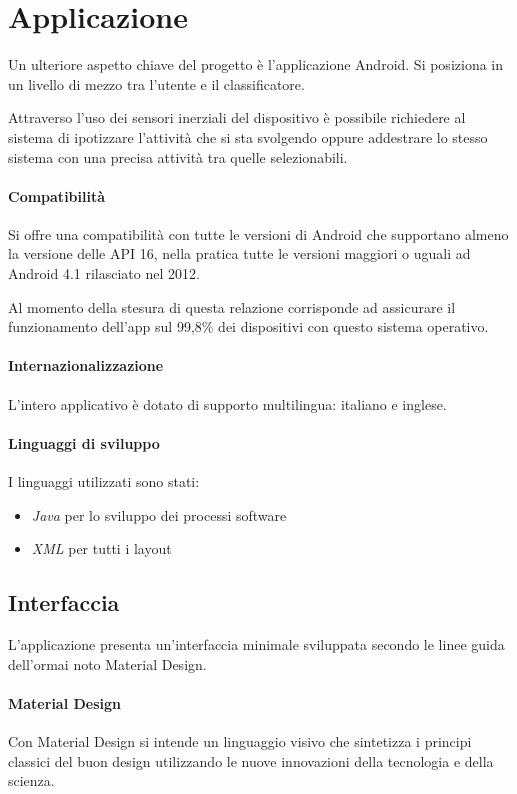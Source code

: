 \chapter{Applicazione}
\label{chapter:app}
Un ulteriore aspetto chiave del progetto è l'applicazione Android. 
Si posiziona in un livello di mezzo tra l'utente e il classificatore.

Attraverso l'uso dei sensori inerziali del dispositivo è possibile richiedere al sistema di ipotizzare l'attività che si sta svolgendo 
oppure addestrare lo stesso sistema con una precisa attività tra quelle selezionabili.




\subsubsection{Compatibilità}
Si offre una compatibilità con tutte le versioni di Android che supportano almeno la versione delle API 16, nella pratica tutte
le versioni maggiori o uguali ad Android 4.1 rilasciato nel 2012. 

Al momento della stesura di questa relazione corrisponde ad assicurare il funzionamento dell'app sul 99,8\% dei dispositivi 
con questo sistema operativo.

\subsubsection{Internazionalizzazione}
L'intero applicativo è dotato di supporto multilingua: italiano e inglese.

\subsubsection{Linguaggi di sviluppo}
I linguaggi utilizzati sono stati: 
\begin{itemize}
    \item \textit{Java} per lo sviluppo dei processi software
    \item \textit{XML} per tutti i layout
\end{itemize}


\newpage
\section{Interfaccia}
L'applicazione presenta un'interfaccia minimale sviluppata secondo le linee guida dell'ormai noto Material Design.

\subsubsection{Material Design}
Con Material Design \cite{material} si intende un linguaggio visivo che sintetizza i principi classici 
del buon design utilizzando le nuove innovazioni della tecnologia e della scienza.

